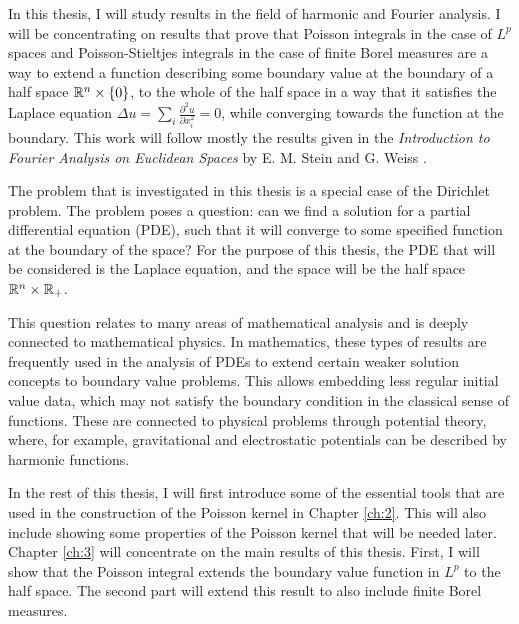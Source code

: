 In this thesis, I will study results in the field of harmonic and Fourier analysis. I will be concentrating on results that prove that Poisson integrals in the case of $L^p$ spaces and Poisson-Stieltjes integrals in the case of finite Borel measures are a way to extend a function describing some boundary value at the boundary of a half space $\mathbb R^n\times\{0\}$, to the whole of the half space in a way that it satisfies the Laplace equation $\Delta u=\sum_i \frac{\partial^2 u}{\partial x_i^2}=0$, while converging towards the function at the boundary. This work will follow mostly the results given in the \textit{Introduction to Fourier Analysis on Euclidean Spaces} by E. M. Stein and G. Weiss \cite{stein_weiss}.

The problem that is investigated in this thesis is a special case of the Dirichlet problem. The problem poses a question: can we find a solution for a partial differential equation (PDE), such that it will converge to some specified function at the boundary of the space? For the purpose of this thesis, the PDE that will be considered is the Laplace equation, and the space will be the half space $\mathbb R^n\times\mathbb R_+$.

This question relates to many areas of mathematical analysis and is deeply connected to mathematical physics. In mathematics, these types of results are frequently used in the analysis of PDEs to extend certain weaker solution concepts to boundary value problems. This allows embedding less regular initial value data, which may not satisfy the boundary condition in the classical sense of functions. These are connected to physical problems through potential theory, where, for example, gravitational and electrostatic potentials can be described by harmonic functions.

In the rest of this thesis, I will first introduce some of the essential tools that are used in the construction of the Poisson kernel in Chapter \ref{ch:2}. This will also include showing some properties of the Poisson kernel that will be needed later. Chapter \ref{ch:3} will concentrate on the main results of this thesis. First, I will show that the Poisson integral extends the boundary value function in $L^p$ to the half space. The second part will extend this result to also include finite Borel measures.